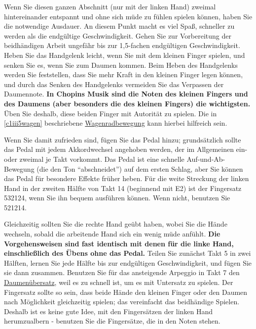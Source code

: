 Wenn Sie diesen ganzen Abschnitt (nur mit der linken Hand) zweimal hintereinander entspannt und ohne sich müde zu fühlen spielen können, haben Sie die notwendige Ausdauer.
An diesem Punkt macht es viel Spaß, schneller zu werden als die endgültige Geschwindigkeit.
Gehen Sie zur Vorbereitung der beidhändigen Arbeit ungefähr bis zur 1,5-fachen endgültigen Geschwindigkeit.
Heben Sie das Handgelenk leicht, wenn Sie mit dem kleinen Finger spielen, und senken Sie es, wenn Sie zum Daumen kommen.
Beim Heben des Handgelenks werden Sie feststellen, dass Sie mehr Kraft in den kleinen Finger legen können, und durch das Senken des Handgelenks vermeiden Sie das Verpassen der Daumennote.
\textbf{In Chopins Musik sind die Noten des kleinen Fingers und des Daumens (aber besonders die des kleinen Fingers) die wichtigsten.}
Üben Sie deshalb, diese beiden Finger mit Autorität zu spielen.
Die in \ref*{c1iii5wagen} beschriebene \hyperref[c1iii5wagen]{Wagenradbewegung} kann hierbei hilfreich sein.

Wenn Sie damit zufrieden sind, fügen Sie das Pedal hinzu; grundsätzlich sollte das Pedal mit jedem Akkordwechsel angehoben werden, der im Allgemeinen ein- oder zweimal je Takt vorkommt.
Das Pedal ist eine schnelle Auf-und-Ab-Bewegung (die den Ton \enquote{abschneidet}) auf dem ersten Schlag, aber Sie können das Pedal für besondere Effekte früher heben.
Für die weite Streckung der linken Hand in der zweiten Hälfte von Takt 14 (beginnend mit E2) ist der Fingersatz 532124, wenn Sie ihn bequem ausführen können.
Wenn nicht, benutzen Sie 521214.

Gleichzeitig sollten Sie die rechte Hand geübt haben, wobei Sie die Hände wechseln, sobald die arbeitende Hand sich ein wenig müde anfühlt.
\textbf{Die Vorgehensweisen sind fast identisch mit denen für die linke Hand, einschließlich des Übens ohne das Pedal.}
Teilen Sie zunächst Takt 5 in zwei Hälften, lernen Sie jede Hälfte bis zur endgültigen Geschwindigkeit, und fügen Sie sie dann zusammen.
Benutzen Sie für das ansteigende Arpeggio in Takt 7 den \hyperref[c1iii5a]{Daumenübersatz}, weil es zu schnell ist, um es mit Untersatz zu spielen.
Der Fingersatz sollte so sein, dass beide Hände den kleinen Finger oder den Daumen nach Möglichkeit gleichzeitig spielen; das vereinfacht das beidhändige Spielen.
Deshalb ist es keine gute Idee, mit den Fingersätzen der linken Hand herumzualbern - benutzen Sie die Fingersätze, die in den Noten stehen.

